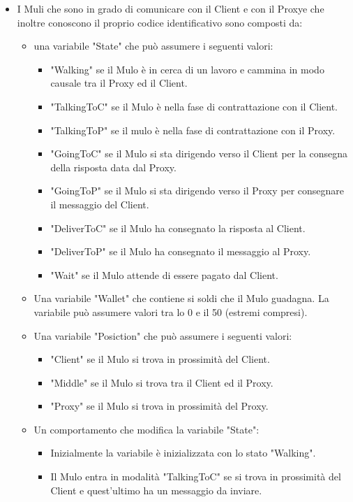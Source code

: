 \documentclass[13pt,a4paper]{article}
\begin{document}
\begin{itemize}
		
		\item I Muli che sono in grado di comunicare con il Client e con il Proxye che inoltre conoscono il proprio codice identificativo sono composti da:
		\begin{itemize}
			\item una variabile "State" che può assumere i seguenti valori:
			\begin{itemize}
				\item "Walking" se il Mulo è in cerca di un lavoro e cammina in modo causale tra il Proxy ed il Client.
				\item "TalkingToC" se il Mulo è nella fase di contrattazione con il Client.
				\item "TalkingToP" se il mulo è nella fase di contrattazione con il Proxy.
				\item "GoingToC" se il Mulo si sta dirigendo verso il Client per la consegna della risposta data dal Proxy.
				\item "GoingToP" se il Mulo si sta dirigendo verso il Proxy per consegnare il messaggio del Client.
				\item "DeliverToC" se il Mulo ha consegnato la risposta al Client.
				\item "DeliverToP" se il Mulo ha consegnato il messaggio al Proxy.
				\item "Wait" se il Mulo attende di essere pagato dal Client.
			\end{itemize}
		\item Una variabile "Wallet" che contiene si soldi che il Mulo guadagna.  La variabile può assumere valori tra lo 0 e il 50 (estremi compresi).
		\item Una variabile "Posiction" che può assumere i seguenti valori:
		\begin{itemize}
			\item "Client" se il Mulo si trova in prossimità del Client.
			\item "Middle" se il Mulo si trova tra il Client ed il Proxy.
			\item "Proxy" se il Mulo si trova in prossimità del Proxy.
		\end{itemize}
	\item Un comportamento che modifica la variabile "State":
	\begin{itemize}
		\item Inizialmente la variabile è inizializzata con lo stato "Walking".
		\item Il Mulo entra in modalità "TalkingToC" se si trova in prossimità del Client e quest'ultimo ha un messaggio da inviare.

\end{itemize}
\end{itemize}
\end{itemize}
\end{document}
